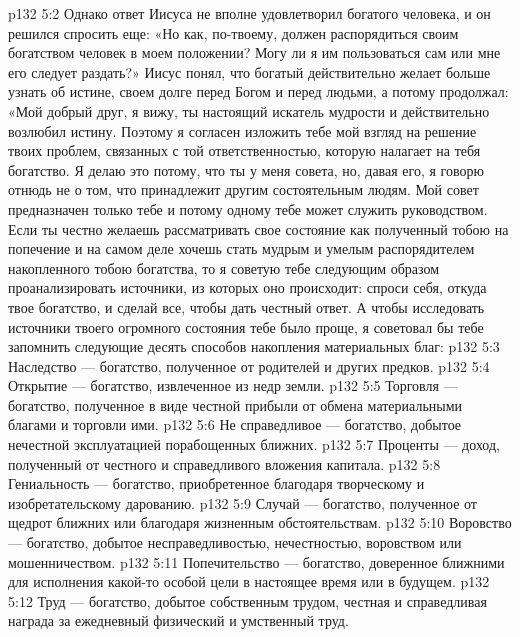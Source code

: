 \vs p132 5:2 Однако ответ Иисуса не вполне удовлетворил богатого человека, и он решился спросить еще: «Но как, по\hyp{}твоему, должен распорядиться своим богатством человек в моем положении? Могу ли я им пользоваться сам или мне его следует раздать?» Иисус понял, что богатый действительно желает больше узнать об истине, своем долге перед Богом и перед людьми, а потому продолжал: «Мой добрый друг, я вижу, ты настоящий искатель мудрости и действительно возлюбил истину. Поэтому я согласен изложить тебе мой взгляд на решение твоих проблем, связанных с той ответственностью, которую налагает на тебя богатство. Я делаю это потому, что ты  у меня совета, но, давая его, я говорю отнюдь не о том, что принадлежит другим состоятельным людям. Мой совет предназначен только тебе и потому одному тебе может служить руководством. Если ты честно желаешь рассматривать свое состояние как полученный тобою на попечение и на самом деле хочешь стать мудрым и умелым распорядителем накопленного тобою богатства, то я советую тебе следующим образом проанализировать источники, из которых оно происходит: спроси себя, откуда твое богатство, и сделай все, чтобы дать честный ответ. А чтобы исследовать источники твоего огромного состояния тебе было проще, я советовал бы тебе запомнить следующие десять способов накопления материальных благ:
\vs p132 5:3 \bibnobreakspace Наследство --- богатство, полученное от родителей и других предков.
\vs p132 5:4 \bibnobreakspace Открытие --- богатство, извлеченное из недр земли.
\vs p132 5:5 \bibnobreakspace Торговля --- богатство, полученное в виде честной прибыли от обмена материальными благами и торговли ими.
\vs p132 5:6 \bibnobreakspace Не справедливое --- богатство, добытое нечестной эксплуатацией порабощенных ближних.
\vs p132 5:7 \bibnobreakspace Проценты --- доход, полученный от честного и справедливого вложения капитала.
\vs p132 5:8 \bibnobreakspace Гениальность --- богатство, приобретенное благодаря творческому и изобретательскому дарованию.
\vs p132 5:9 \bibnobreakspace Случай --- богатство, полученное от щедрот ближних или благодаря жизненным обстоятельствам.
\vs p132 5:10 \bibnobreakspace Воровство --- богатство, добытое несправедливостью, нечестностью, воровством или мошенничеством.
\vs p132 5:11 \bibnobreakspace Попечительство --- богатство, доверенное ближними для исполнения какой\hyp{}то особой цели в настоящее время или в будущем.
\vs p132 5:12 \bibnobreakspace Труд --- богатство, добытое собственным трудом, честная и справедливая награда за ежедневный физический и умственный труд.
